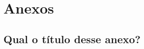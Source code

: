 \documentclass[pdftex,12pt,oneside,a4paper,english,french,spanish,brazil]{abntex2}
\begin{document}
\begin{sloppypar}


            \part*{Anexos}
            \begin{anexosenv}

                \chapter{Qual o título desse anexo?}\label{anex:anex01}
                

            \end{anexosenv}

            \printindex

    \end{sloppypar}
\end{document}
